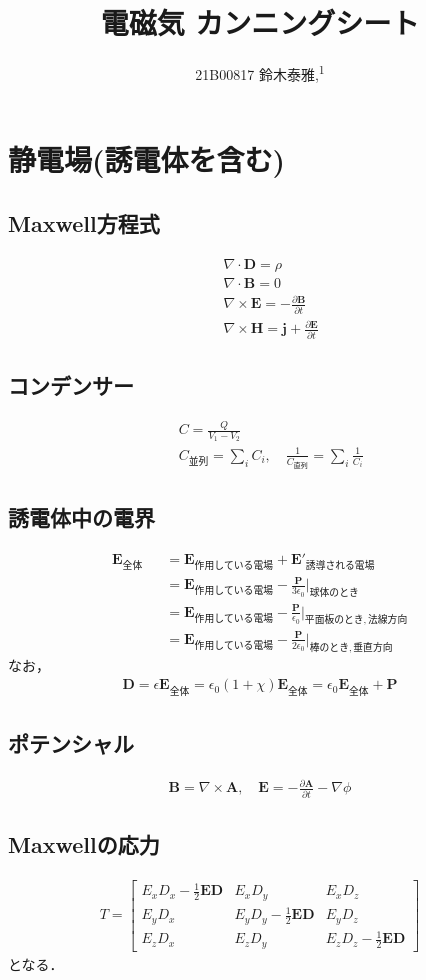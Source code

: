 \documentclass[12pt,dvipdfmx]{jsarticle}
\newcommand\authormark[1]{\textsuperscript{#1}}
\begin{document}
\title{電磁気 カンニングシート}

\author{21B00817 鈴木泰雅,\authormark{1}}
\section*{\Large{静電場(誘電体を含む)}}
\subsection*{Maxwell方程式}
\begin{eqnarray}
  &&\nabla\cdot \bm{D} = \rho\\
  &&\nabla\cdot\bm{B}=0\\
  &&\nabla\times \bm{E} = -\frac{\partial \bm{B}}{\partial t}\\
  &&\nabla\times \bm{H} = \bm{j} + \frac{\partial\bm{E}}{\partial t}
\end{eqnarray}
\subsection*{コンデンサー}
\begin{eqnarray}
  &&C= \frac{Q}{V_1-V_2}\\
  &&C_{並列} = \sum_i C_i,\quad \frac{1}{C_{直列}} = \sum_i \frac{1}{C_i}
\end{eqnarray}
\subsection*{誘電体中の電界}
\begin{eqnarray}
  \bm{E}_{全体} &&= \bm{E}_{作用している電場} + \bm{E}'_{誘導される電場}\\
  &&=\bm{E}_{作用している電場} - \frac{\bm{P}}{3\epsilon_0}|_{球体のとき}\\
  &&=\bm{E}_{作用している電場} - \frac{\bm{P}}{\epsilon_0}|_{平面板のとき, 法線方向}\\
  &&=\bm{E}_{作用している電場} - \frac{\bm{P}}{2\epsilon_0}|_{棒のとき, 垂直方向}
\end{eqnarray}
なお，
\begin{eqnarray}
  \bm{D} = \epsilon \bm{E}_{全体}= \epsilon_0\left(1+\chi  \right)\bm{E}_{全体} = \epsilon_0 \bm{E}_{全体} + \bm{P}  
\end{eqnarray}
\subsection*{ポテンシャル}
\begin{eqnarray}
  \bm{B} = \nabla\times \bm{A},\quad \bm{E} = -\frac{\partial\bm{A}}{\partial t} -\nabla\phi
\end{eqnarray}
\subsection*{Maxwellの応力}
\begin{eqnarray}
  T = 
  \begin{bmatrix}
    E_x D_x -\frac{1}{2}\bm{E}\bm{D} & E_x D_y & E_x D_z\\
    E_y D_x  & E_y D_y -\frac{1}{2}\bm{E}\bm{D}  & E_y D_z\\
    E_z D_x  & E_z D_y & E_z D_z -\frac{1}{2}\bm{E}\bm{D}
  \end{bmatrix}
\end{eqnarray}
となる．
\end{document}
